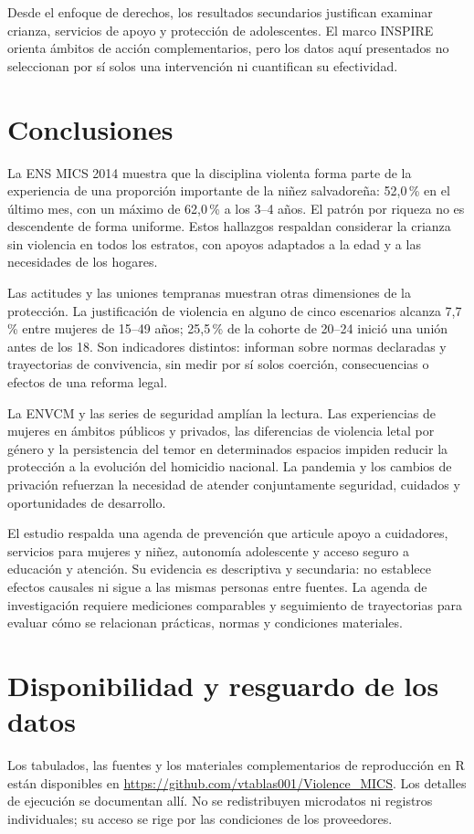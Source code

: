 \documentclass[11pt,a4paper]{article}
\begin{document}
Desde el enfoque de derechos, los resultados secundarios justifican examinar
crianza, servicios de apoyo y protección de adolescentes. El marco INSPIRE
orienta ámbitos de acción complementarios, pero los datos aquí presentados
no seleccionan por sí solos una intervención ni cuantifican su efectividad.



\FloatBarrier
\section{Conclusiones}
La ENS MICS 2014 muestra que la disciplina violenta forma parte de la
experiencia de una proporción importante de la niñez salvadoreña: 52,0\,\%
en el último mes, con un máximo de 62,0\,\% a los 3--4 años. El patrón por
riqueza no es descendente de forma uniforme. Estos hallazgos respaldan
considerar la crianza sin violencia en todos los estratos, con apoyos
adaptados a la edad y a las necesidades de los hogares.

Las actitudes y las uniones tempranas muestran otras dimensiones de la
protección. La justificación de violencia en alguno de cinco escenarios
alcanza 7,7\,\% entre mujeres de 15--49 años; 25,5\,\% de la cohorte de
20--24 inició una unión antes de los 18. Son indicadores distintos:
informan sobre normas declaradas y trayectorias de convivencia, sin medir
por sí solos coerción, consecuencias o efectos de una reforma legal.

La ENVCM y las series de seguridad amplían la lectura. Las experiencias de
mujeres en ámbitos públicos y privados, las diferencias de violencia letal
por género y la persistencia del temor en determinados espacios impiden
reducir la protección a la evolución del homicidio nacional. La pandemia y
los cambios de privación refuerzan la necesidad de atender conjuntamente
seguridad, cuidados y oportunidades de desarrollo.

El estudio respalda una agenda de prevención que articule apoyo a cuidadores,
servicios para mujeres y niñez, autonomía adolescente y acceso seguro a
educación y atención. Su evidencia es descriptiva y secundaria: no establece
efectos causales ni sigue a las mismas personas entre fuentes. La agenda de
investigación requiere mediciones comparables y seguimiento de trayectorias
para evaluar cómo se relacionan prácticas, normas y condiciones materiales.

\section*{Disponibilidad y resguardo de los datos}
Los tabulados, las fuentes y los materiales complementarios de reproducción
en R están disponibles en \url{https://github.com/vtablas001/Violence_MICS}.
Los detalles de ejecución se documentan allí. No se redistribuyen microdatos
ni registros individuales; su acceso se rige por las condiciones de los proveedores.
\end{document}
